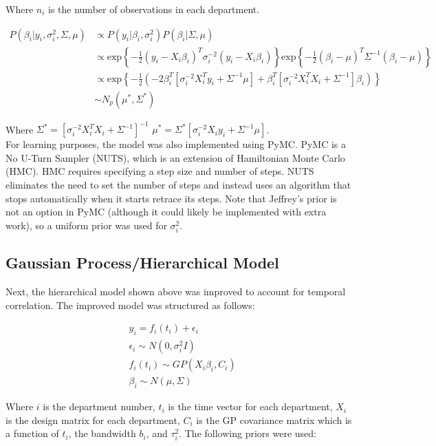 \documentclass[paper=a4, fontsize=11pt]{scrartcl}
\begin{document}
Where $n_i$ is the number of observations in each department.

\begin{align*}
     P(\beta_i | y_i, \sigma^2_i, \Sigma, \mu ) & \propto P(y_i| \beta_i,  \sigma^2_i)P(\beta_i| \Sigma, \mu) \\
     & \propto\mbox{exp}\left \{ -\frac{1}{2}(y_i-X_i\beta_i)^T \sigma^{-2}_i(y_i-X_i\beta_i)      \right \} \mbox{exp}\left \{ -\frac{1}{2}(\beta_i-\mu)^T \Sigma^{-1}(\beta_i-\mu)      \right \} \\
     & \propto \mbox{exp}\left \{ -\frac{1}{2}\left(-2\beta_i^T[\sigma^{-2}_iX_i^Ty_i + \Sigma^{-1}\mu] + \beta_i^T[\sigma^{-2}_i X^T_i X_i + 
     \Sigma^{-1}]\beta_i \right)      \right \}\\
    &\sim N_p (\mu^*, \Sigma^*)
\end{align*}


Where  $\Sigma^*=[\sigma^{-2}_iX^T_iX_i + 
     \Sigma^{-1}]^{-1} $ $\mu^*=\Sigma^*[\sigma^{-2}_i X_i y_i + \Sigma^{-1}\mu]$.\\


For learning purposes, the model was also implemented using PyMC. PyMC is a No U-Turn Sampler (NUTS), which is an extension of Hamiltonian Monte Carlo (HMC). HMC requires specifying a step size and number of steps. NUTS eliminates the need to set the number of steps and instead uses an algorithm that stops automatically
when it starts retrace its steps. Note that Jeffrey's prior is not an option in PyMC (although it could likely be implemented with extra work), so a uniform prior was used for $\sigma_i^2$.

\subsection{Gaussian Process/Hierarchical Model}
Next, the hierarchical model shown above was improved to account for temporal correlation. The improved model was structured as follows:

\begin{align*}
    &y_i = f_i (t_i) + \epsilon_i \\
     &\epsilon_i \sim N(0, \sigma^2_i I)\\
     &f_i (t_i) \sim GP(X_i \beta_i, C_i)\\
     & \beta_i \sim N(\mu, \Sigma)
\end{align*}

Where $i$ is the department number, $t_i$ is the time vector for each department, $X_i$ is the design matrix for each department, $C_i$ is the GP covariance matrix which is a function of $t_i$, the bandwidth $b_i$, and $\tau^2_i$. The following priors were used:
\end{document}
